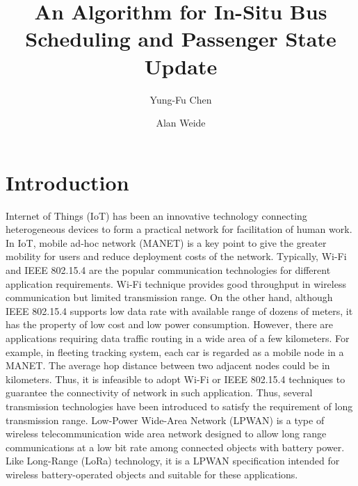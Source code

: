 \documentclass[runningheads]{llncs}
\begin{document}
\mainmatter  %

\title{An Algorithm for In-Situ Bus Scheduling and Passenger State Update}


%
%
\author{Yung-Fu Chen \and Alan Weide}



\maketitle

\renewcommand\thelstlisting{\arabic{lstlisting}}

\section{Introduction}
Internet of Things (IoT) has been an innovative technology connecting heterogeneous devices to form a practical network for facilitation of human work. In IoT, mobile ad‐hoc network (MANET) is a key point to give the greater mobility for users and reduce deployment costs of the network. Typically, Wi-Fi and IEEE 802.15.4 are the popular communication technologies for different application requirements. Wi-Fi technique provides good throughput in wireless communication but limited transmission range. On the other hand, although IEEE 802.15.4 supports low data rate with available range of dozens of meters, it has the property of low cost and low power consumption. However, there are applications requiring data traffic routing in a wide area of a few kilometers. For example, in fleeting tracking system, each car is regarded as a mobile node in a MANET. The average hop distance between two adjacent nodes could be in kilometers. Thus, it is infeasible to adopt Wi-Fi or IEEE 802.15.4 techniques to guarantee the connectivity of network in such application. Thus, several transmission technologies have been introduced to satisfy the requirement of long transmission range. Low-Power Wide-Area Network (LPWAN) is a type of wireless telecommunication wide area network designed to allow long range communications at a low bit rate among connected objects with battery power. Like Long-Range (LoRa) technology, it is a LPWAN specification intended for wireless battery-operated objects and suitable for these applications.
\end{document}
